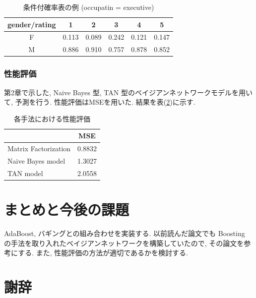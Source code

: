 \documentclass[a4paper]{jarticle}
\begin{document}
\begin{table}[H]
\begin{center}
\label{CPTsample}
\caption{条件付確率表の例 (occupatin = executive)}
\begin{tabular}{|c||c|c|c|c|c|} \hline  
gender/rating & 1 & 2 & 3 & 4 & 5 \\ \hline \hline
F & 0.113 & 0.089 & 0.242 & 0.121 & 0.147 \\
M & 0.886 & 0.910 & 0.757 & 0.878 & 0.852 \\ \hline
\end{tabular}
\end{center}
\end{table}

\subsubsection{性能評価}

第2章で示した, Naive Bayes 型, TAN 型のベイジアンネットワークモデルを用いて, 予測を行う. 性能評価はMSEを用いた. 結果を表(\ref{modelmse})に示す.

\begin{table}[H]
\begin{center}
\caption{各手法における性能評価}   %
\label{modelmse}   %
\begin{tabular}{l c}
\hline
                            & MSE \\ \hline
Matrix Factorization &  0.8832 \\ \hline
Naive Bayes model  & 1.3027 \\ \hline
TAN model             & 2.0558 \\ \hline
\end{tabular}
\end{center}
\end{table}

\section{まとめと今後の課題}

AdaBoost, バギングとの組み合わせを実装する. 以前読んだ論文でも Boosting の手法を取り入れたベイジアンネットワークを構築していたので, その論文を参考にする. また, 性能評価の方法が適切であるかを検討する. 

\section{謝辞}



\newpage
{} %




\end{document}
